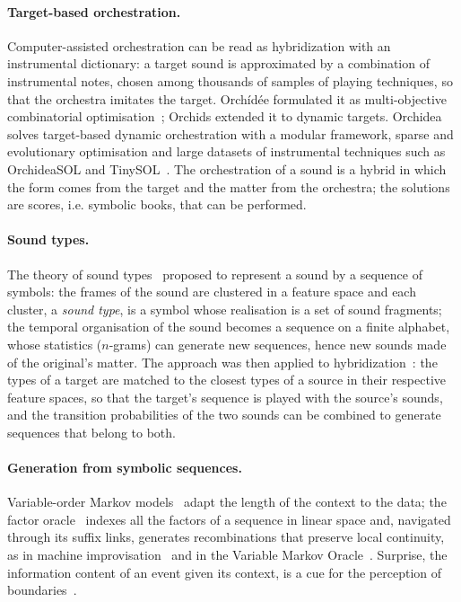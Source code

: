 \documentclass[11pt,a4paper]{article}
\begin{document}
\paragraph{Target-based orchestration.} Computer-assisted orchestration can
be read as hybridization with an instrumental dictionary: a target sound is
approximated by a combination of instrumental notes, chosen among thousands
of samples of playing techniques, so that the orchestra imitates the
target. Orch\'id\'ee formulated it as multi-objective combinatorial
optimisation~\cite{carpentier2010}; Orchids extended it to dynamic targets.
Orchidea~\cite{cella2022orchidea,cella2018toolbox} solves target-based
dynamic orchestration with a modular framework, sparse and evolutionary
optimisation and large datasets of instrumental techniques such as
OrchideaSOL and TinySOL~\cite{cella2020orchideasol}. The orchestration of a
sound is a hybrid in which the form comes from the target and the matter
from the orchestra; the solutions are scores, i.e. symbolic books, that can
be performed.

\paragraph{Sound types.} The theory of sound types~\cite{cella2011soundtypes}
proposed to represent a sound by a sequence of symbols: the frames of the
sound are clustered in a feature space and each cluster, a \emph{sound
type}, is a symbol whose realisation is a set of sound fragments; the
temporal organisation of the sound becomes a sequence on a finite alphabet,
whose statistics ($n$-grams) can generate new sequences, hence new sounds
made of the original's matter. The approach was then applied to
hybridization~\cite{cella2013hybrid}: the types of a target are matched to
the closest types of a source in their respective feature spaces, so that the
target's sequence is played with the source's sounds, and the transition
probabilities of the two sounds can be combined to generate sequences that
belong to both.

\paragraph{Generation from symbolic sequences.} Variable-order Markov
models~\cite{ron1996,begleiter2004} adapt the length of the context to the
data; the factor oracle~\cite{allauzen1999} indexes all the factors of a
sequence in linear space and, navigated through its suffix links, generates
recombinations that preserve local continuity, as in machine
improvisation~\cite{assayag2004} and in the Variable Markov
Oracle~\cite{wang2014}. Surprise, the information content of an event given
its context, is a cue for the perception of
boundaries~\cite{abdallah2009,pearce2010}.
\end{document}
